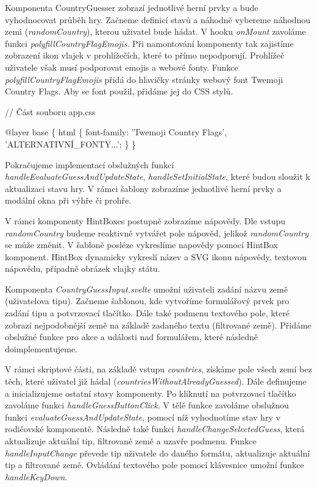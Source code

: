 Komponenta CountryGuesser zobrazí jednotlivé herní prvky a bude vyhodnocovat průběh hry. 
Začneme definicí stavů a náhodně vybereme náhodnou zemi (\emph{randomCountry}), kterou uživatel bude hádat. 
V hooku \emph{onMount} zavoláme funkci \emph{polyfillCountryFlagEmojis}. Při namontování komponenty tak zajistíme zobrazení ikon vlajek v prohlížečích, které to přímo nepodporují. 
Prohlížeč uživatele však musí podporovat emojis a webové fonty. Funkce \emph{polyfillCountryFlagEmojis} přidá do hlavičky stránky webový font Twemoji Country Flags. 
Aby se font použil, přidáme jej do CSS stylů.

\begin{prog}
// Část souboru app.css

@layer base \{
  html \{
    font-family: 'Twemoji Country Flags', 'ALTERNATIVNÍ_FONTY...';
  \}
\}
\end{prog}

Pokračujeme implementací obslužných funkcí \emph{handleEvaluateGuessAndUpdateState}, \emph{handleSetInitialState}, které budou sloužit k aktualizaci stavu hry. 
V rámci šablony zobrazíme jednotlivé herní prvky a modální okna při výhře či prohře.

V rámci komponenty HintBoxes postupně zobrazíme nápovědy. Dle vstupu \emph{randomCountry} budeme reaktivně vytvářet pole nápověd, jelikož \emph{randomCountry} se může změnit. 
V šabloně posléze vykreslíme napovědy pomocí HintBox komponent. HintBox dynamicky vykreslí název a SVG ikonu nápovědy, textovou nápovědu, případně obrázek vlajky státu.

Komponenta \emph{CountryGuessInput.svelte} umožní uživateli zadání názvu země (uživatelova tipu). Začneme šablonou, kde vytvoříme formulářový prvek pro zadání tipu a potvrzovací tlačítko. 
Dále také podmenu textového pole, které zobrazí nejpodobnější země na základě zadaného textu (filtrované země). Přidáme obslužné funkce pro akce a události nad formulářem, které následně doimplementujeme.

V rámci skriptové části, na základě vstupu \emph{countries}, získáme pole všech zemí bez těch, které uživatel již hádal (\emph{countriesWithoutAlreadyGuessed}). 
Dále definujeme a inicializujeme ostatní stavy komponenty. Po kliknutí na potvrzovací tlačítko zavoláme funkci \emph{handleGuessButtonClick}. 
V tělě funkce zavoláme obslužnou funkci \emph{evaluateGuessAndUpdateState}, pomocí níž vyhodnotíme stav hry v rodičovské komponentě. 
Následně také funkci \emph{handleChangeSelectedGuess}, která aktualizuje aktuální tip, filtrované země a uzavře podmenu. 
Funkce \emph{handleInputChange} převede tip uživatele do daného formátu, aktualizuje aktuální tip a filtrované země. Ovládání textového pole pomocí klávesnice umožní funkce \emph{handleKeyDown}.

